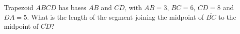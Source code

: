 Trapezoid $ABCD$ has bases $\overline{AB}$ and $\overline{CD}$, with $AB=3$, $BC=6$, $CD=8$ and $DA=5$. What is the length of the segment joining the midpoint of $\overline{BC}$ to the midpoint of $\overline{CD}$?
